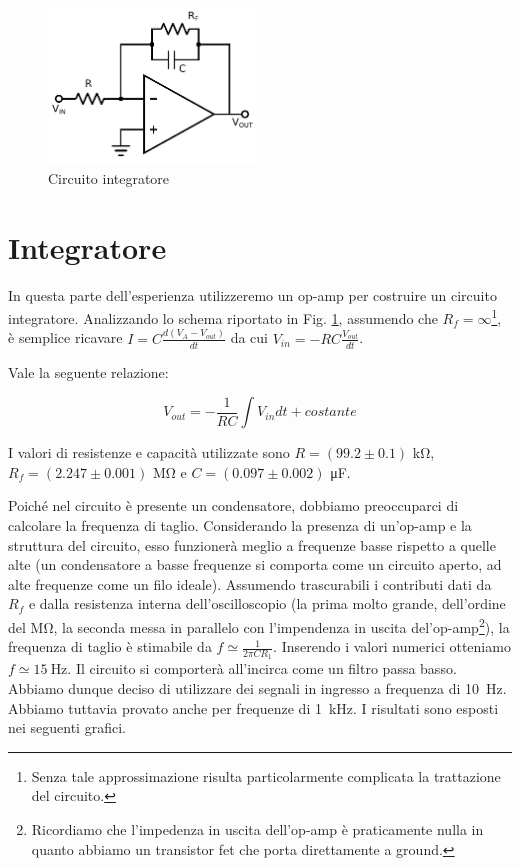 \begin{figure}
	\includegraphics[width=55mm]{ccint.pdf}
	\caption{Circuito integratore}
	\label{fig:ccint}
\end{figure}

\section{Integratore}

In questa parte dell'esperienza utilizzeremo un op-amp per costruire un circuito integratore. Analizzando lo schema riportato in Fig. \ref{fig:ccint}, assumendo che $R_f=\infty$\footnote{Senza tale approssimazione risulta particolarmente complicata la trattazione del circuito.}, è semplice ricavare $I=C\frac{d(V_A-V_{out})}{dt}$ da cui $V_{in}=-RC\frac{V_{out}}{dt}$.

Vale la seguente relazione:%

\begin{equation}
V_{out}=-\frac{1}{RC} \int V_{in}dt +costante
\label{eq:int}
\end{equation}

I valori di resistenze e capacità utilizzate sono $R=(99.2 \pm 0.1)$ \si{\kilo\ohm},\\
$R_f=(2.247 \pm 0.001)$ \si{\mega\ohm} e $C=(0.097 \pm 0.002)$ \si{\micro\farad}. 

Poiché nel circuito è presente un condensatore, dobbiamo preoccuparci di calcolare la frequenza di taglio.
Considerando la presenza di un'op-amp e la struttura del circuito, esso funzionerà meglio a frequenze basse rispetto a quelle alte (un condensatore a basse frequenze si comporta come un circuito aperto, ad alte frequenze come un filo ideale).
Assumendo trascurabili i contributi dati da $R_f$ e dalla resistenza interna dell'oscilloscopio (la prima molto grande, dell'ordine del $\si{\mega\ohm}$, la seconda messa in parallelo con l'impendenza in uscita del'op-amp\footnote{Ricordiamo che l'impedenza in uscita dell'op-amp è praticamente nulla in quanto abbiamo un transistor fet che porta direttamente a ground.}), la frequenza di taglio è stimabile da $f\simeq \frac{1}{2\pi C R_1}$.
Inserendo i valori numerici otteniamo $f \simeq \SI{15}{\hertz}$.
Il circuito si comporterà all'incirca come un filtro passa basso.
Abbiamo dunque deciso di utilizzare dei segnali in ingresso a frequenza di \SI{10}{\hertz}.
Abbiamo tuttavia provato anche per frequenze di \SI{1}{\kilo\hertz}.
I risultati sono esposti nei seguenti grafici.

